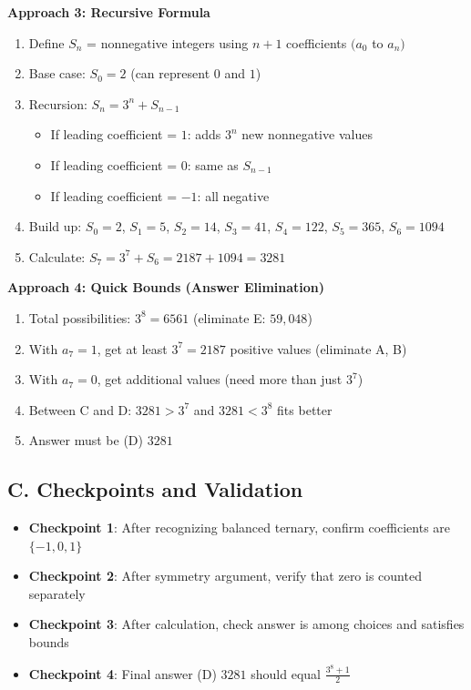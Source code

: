 \documentclass[12pt]{article}
\begin{document}
\begin{roadmapbox}
\textbf{Approach 3: Recursive Formula}
\begin{enumerate}
    \item Define $S_n$ = nonnegative integers using $n+1$ coefficients $(a_0$ to $a_n)$
    \item Base case: $S_0 = 2$ (can represent $0$ and $1$)
    \item Recursion: $S_n = 3^n + S_{n-1}$
    \begin{itemize}
        \item If leading coefficient = $1$: adds $3^n$ new nonnegative values
        \item If leading coefficient = $0$: same as $S_{n-1}$
        \item If leading coefficient = $-1$: all negative
    \end{itemize}
    \item Build up: $S_0=2$, $S_1=5$, $S_2=14$, $S_3=41$, $S_4=122$, $S_5=365$, $S_6=1094$
    \item Calculate: $S_7 = 3^7 + S_6 = 2187 + 1094 = 3281$
\end{enumerate}

\textbf{Approach 4: Quick Bounds (Answer Elimination)}
\begin{enumerate}
    \item Total possibilities: $3^8 = 6561$ (eliminate E: $59,048$)
    \item With $a_7=1$, get at least $3^7 = 2187$ positive values (eliminate A, B)
    \item With $a_7=0$, get additional values (need more than just $3^7$)
    \item Between C and D: $3281 > 3^7$ and $3281 < 3^8$ fits better
    \item Answer must be (D) $3281$
\end{enumerate}

\subsection*{C. Checkpoints and Validation}

\begin{itemize}
    \item \textbf{Checkpoint 1}: After recognizing balanced ternary, confirm coefficients are $\{-1,0,1\}$
    \item \textbf{Checkpoint 2}: After symmetry argument, verify that zero is counted separately
    \item \textbf{Checkpoint 3}: After calculation, check answer is among choices and satisfies bounds
    \item \textbf{Checkpoint 4}: Final answer (D) $3281$ should equal $\frac{3^8+1}{2}$
\end{itemize}


\end{roadmapbox}
\end{document}
